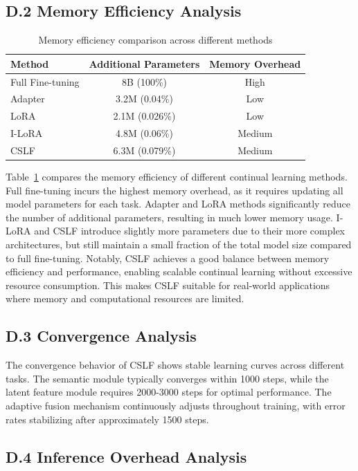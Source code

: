 \documentclass[11pt]{article}
\begin{document}
\subsection*{D.2 Memory Efficiency Analysis}

\begin{table}[t]
\centering
\begin{tabular}{lcc}
\toprule
Method & Additional Parameters & Memory Overhead \\
\midrule
Full Fine-tuning & 8B (100\%) & High \\
Adapter & 3.2M (0.04\%) & Low \\
LoRA & 2.1M (0.026\%) & Low \\
I-LoRA & 4.8M (0.06\%) & Medium \\
CSLF & 6.3M (0.079\%) & Medium \\
\bottomrule
\end{tabular}
\caption{Memory efficiency comparison across different methods}
\label{tab:memory-efficiency}
\end{table}

Table~\ref{tab:memory-efficiency} compares the memory efficiency of different continual learning methods. Full fine-tuning incurs the highest memory overhead, as it requires updating all model parameters for each task. Adapter and LoRA methods significantly reduce the number of additional parameters, resulting in much lower memory usage. I-LoRA and CSLF introduce slightly more parameters due to their more complex architectures, but still maintain a small fraction of the total model size compared to full fine-tuning. Notably, CSLF achieves a good balance between memory efficiency and performance, enabling scalable continual learning without excessive resource consumption. This makes CSLF suitable for real-world applications where memory and computational resources are limited.

\subsection*{D.3 Convergence Analysis}

The convergence behavior of CSLF shows stable learning curves across different tasks. The semantic module typically converges within 1000 steps, while the latent feature module requires 2000-3000 steps for optimal performance. The adaptive fusion mechanism continuously adjusts throughout training, with error rates stabilizing after approximately 1500 steps.

\subsection*{D.4 Inference Overhead Analysis}
\end{document}
